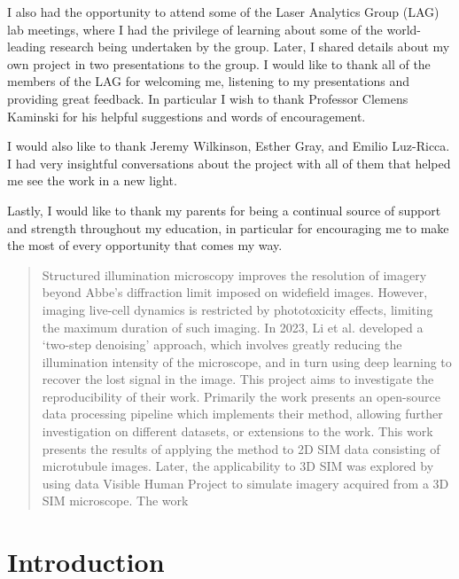 \documentclass[12pt]{article}
\begin{document}
I also had the opportunity to attend some of the Laser Analytics Group (LAG) lab meetings,
where I had the privilege of learning about some of the world-leading research being undertaken by the group.
Later, I shared details about my own project in two presentations to the group.
I would like to thank all of the members of the LAG for welcoming me, listening to my presentations and providing great feedback.
In particular I wish to thank Professor Clemens Kaminski for his helpful suggestions and words of encouragement.

I would also like to thank Jeremy Wilkinson, Esther Gray, and Emilio Luz-Ricca.
I had very insightful conversations about the project with all of them that helped me see the work in a new light.

Lastly, I would like to thank my parents for being a continual source of support and strength throughout my education,
in particular for encouraging me to make the most of every opportunity that comes my way.

\newpage
\begin{abstract}

    Structured illumination microscopy improves the resolution of imagery beyond Abbe's diffraction limit imposed on widefield images.
    However, imaging live-cell dynamics is restricted by phototoxicity effects, limiting the maximum duration of such imaging.
    In 2023, Li et al. developed a `two-step denoising' approach, which involves greatly reducing the illumination intensity of the microscope,
    and in turn using deep learning to recover the lost signal in the image.
    This project aims to investigate the reproducibility of their work.
    Primarily the work presents an open-source data processing pipeline which implements their method,
    allowing further investigation on different datasets, or extensions to the work.
    This work presents the results of applying the method to 2D SIM data consisting of microtubule images.
    Later, the applicability to 3D SIM was explored by using data Visible Human Project to simulate imagery acquired from a 3D SIM microscope.
    The work

\end{abstract}

\newpage
\tableofcontents

\newpage
{}
\section{Introduction}
\end{document}

